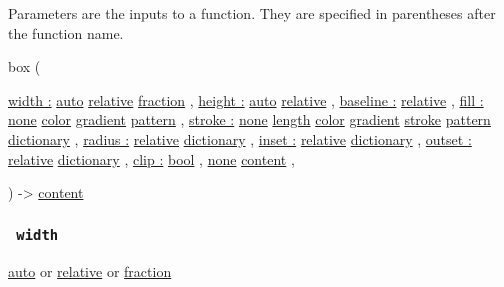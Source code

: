 \label{parameters-tooltip}
Parameters are the inputs to a function. They are specified in
parentheses after the function name.

{ box } (

{ \hyperref[parameters-width]{width :}
\href{/docs/reference/foundations/auto/}{auto}
\href{/docs/reference/layout/relative/}{relative}
\href{/docs/reference/layout/fraction/}{fraction} , } {
\hyperref[parameters-height]{height :}
\href{/docs/reference/foundations/auto/}{auto}
\href{/docs/reference/layout/relative/}{relative} , } {
\hyperref[parameters-baseline]{baseline :}
\href{/docs/reference/layout/relative/}{relative} , } {
\hyperref[parameters-fill]{fill :}
\href{/docs/reference/foundations/none/}{none}
\href{/docs/reference/visualize/color/}{color}
\href{/docs/reference/visualize/gradient/}{gradient}
\href{/docs/reference/visualize/pattern/}{pattern} , } {
\hyperref[parameters-stroke]{stroke :}
\href{/docs/reference/foundations/none/}{none}
\href{/docs/reference/layout/length/}{length}
\href{/docs/reference/visualize/color/}{color}
\href{/docs/reference/visualize/gradient/}{gradient}
\href{/docs/reference/visualize/stroke/}{stroke}
\href{/docs/reference/visualize/pattern/}{pattern}
\href{/docs/reference/foundations/dictionary/}{dictionary} , } {
\hyperref[parameters-radius]{radius :}
\href{/docs/reference/layout/relative/}{relative}
\href{/docs/reference/foundations/dictionary/}{dictionary} , } {
\hyperref[parameters-inset]{inset :}
\href{/docs/reference/layout/relative/}{relative}
\href{/docs/reference/foundations/dictionary/}{dictionary} , } {
\hyperref[parameters-outset]{outset :}
\href{/docs/reference/layout/relative/}{relative}
\href{/docs/reference/foundations/dictionary/}{dictionary} , } {
\hyperref[parameters-clip]{clip :}
\href{/docs/reference/foundations/bool/}{bool} , } {
\hyperref[parameters-body]{}
\href{/docs/reference/foundations/none/}{none}
\href{/docs/reference/foundations/content/}{content} , }

) -\textgreater{} \href{/docs/reference/foundations/content/}{content}

\subsubsection{\texorpdfstring{\texttt{\ width\ }}{ width }}\label{parameters-width}

\href{/docs/reference/foundations/auto/}{auto} {or}
\href{/docs/reference/layout/relative/}{relative} {or}
\href{/docs/reference/layout/fraction/}{fraction}


